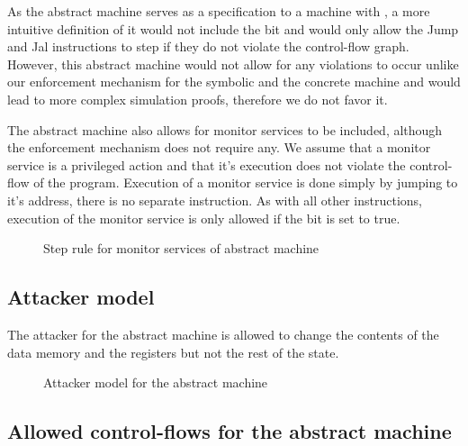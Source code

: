 As the abstract machine serves as a specification to a machine with
\CFI, a more intuitive definition of it would not include the \ok bit
and would only allow the Jump and Jal instructions to step if they do
not violate the control-flow graph. However, this abstract machine
would not allow for any violations to occur unlike our enforcement
mechanism for the symbolic and the concrete machine and would lead to
more complex simulation proofs, therefore we do not favor it.

The abstract machine also allows for monitor services to be included,
although the \CFI enforcement mechanism does not require any. We
assume that a monitor service is a privileged action and that it's
execution does not violate the control-flow of the program. Execution
of a monitor service is done simply by jumping to it's address, there
is no separate instruction. As with all other instructions, execution
of the monitor service is only allowed if the \ok bit is set to true.

\begin{figure}[htb!]
\caption{Step rule for monitor services of abstract machine}
\end{figure}


\subsection{Attacker model}\label{sec:abstract_attacker}

The attacker for the abstract machine is allowed to change the
contents of the data memory and the registers but not the rest of the state.

\begin{figure}[ht]
\caption{Attacker model for the abstract machine}
\end{figure}

\subsection{Allowed control-flows for the abstract machine}
\label{sec:abstract_flow}

